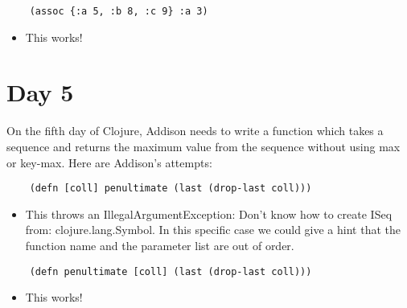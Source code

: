 \documentclass[12pt]{article}
\begin{document}
\begin{verbatim}
	(assoc {:a 5, :b 8, :c 9} :a 3)
\end{verbatim}
\begin{itemize}
	\item This works!
\end{itemize}

\section{Day 5}
On the fifth day of Clojure, Addison needs to write a function which takes a sequence and returns the maximum value from the sequence without using max or key-max. Here are Addison's attempts:

\begin{verbatim}
	(defn [coll] penultimate (last (drop-last coll)))
\end{verbatim}
\begin{itemize}
	\item This throws an IllegalArgumentException: Don't know how to create ISeq from: clojure.lang.Symbol. In this specific case we could give a hint that the function name and the parameter list are out of order.
\end{itemize}

\begin{verbatim}
	(defn penultimate [coll] (last (drop-last coll)))
\end{verbatim}
\begin{itemize}
	\item This works!
\end{itemize}

\end{document}

